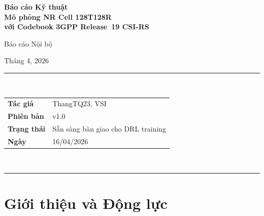 \documentclass[12pt, a4paper]{article}
\begin{document}
\begin{titlepage}
  \centering
  \vspace*{2cm}
  {\LARGE\bfseries Báo cáo Kỹ thuật\\[0.5em]
   Mô phỏng NR Cell 128T128R\\[0.3em]
   với Codebook 3GPP Release~19 CSI-RS
  \par}
  \vspace{1.5cm}
  {\large Báo cáo Nội bộ \par}
  \vspace{0.5cm}
  {\large Tháng 4, 2026 \par}
  \vspace{1.5cm}
  \rule{0.8\textwidth}{0.4pt}\\[0.6em]
  \begin{tabular}{ll}
    \textbf{Tác giả}    & ThangTQ23, VSI \\
    \textbf{Phiên bản}  & v1.0 \\
    \textbf{Trạng thái} & Sẵn sàng bàn giao cho DRL training \\
    \textbf{Ngày}       & 16/04/2026 \\
  \end{tabular}\\[0.6em]
  \rule{0.8\textwidth}{0.4pt}
  \vspace{1.8cm}
  \begin{abstract}
    \noindent
    Báo cáo này ghi lại quá trình thiết kế, hiện thực và kiểm chứng môi
    trường mô phỏng downlink 128T128R massive MIMO tuân thủ 3GPP Release~19 sử dụng CSI-RS,
    xây dựng trên nền MATLAB Wireless Network Toolbox và 5G Toolbox.
    Xuất phát từ baseline link-level Rel-15/16, dự án đã trải qua 4 phiên
    bản để cho ra môi trường NR~Cell system-level đóng vai trò gym cho DRL
    agent học policy scheduling MU-MIMO.
    Đóng góp chính là việc tích hợp các refined codebook (Type I Mode A/B và eTypeII) Release~19 (TS~38.214 \S5.2.2.2.5a) hỗ trợ 128~port, cho phép mô phỏng CSI
    feedback chính xác về mặt không gian cho massive MIMO.
    Báo cáo cung cấp bằng chứng kiểm chứng, bảng tra cứu đặc tả kỹ thuật
    và hướng dẫn sử dụng đầy đủ phục vụ bàn giao dự án.
  \end{abstract}
\end{titlepage}

\tableofcontents
\newpage

\section{Giới thiệu và Động lực}
\end{document}
